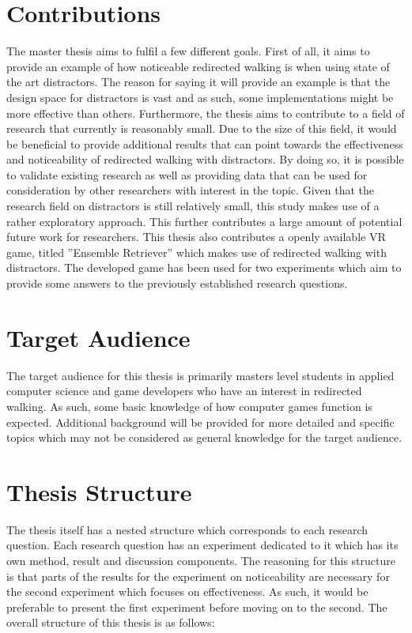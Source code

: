 \section{Contributions}
The master thesis aims to fulfil a few different goals. First of all, it aims to provide an example of how noticeable redirected walking is when using state of the art distractors. The reason for saying it will provide an example is that the design space for distractors is vast and as such, some implementations might be more effective than others. Furthermore, the thesis aims to contribute to a field of research that currently is reasonably small. Due to the size of this field, it would be beneficial to provide additional results that can point towards the effectiveness and noticeability of redirected walking with distractors. By doing so, it is possible to validate existing research as well as providing data that can be used for consideration by other researchers with interest in the topic. Given that the research field on distractors is still relatively small, this study makes use of a rather exploratory approach. This further contributes a large amount of potential future work for researchers. This thesis also contributes a openly available VR game, titled ''Ensemble Retriever'' which makes use of redirected walking with distractors. The developed game has been used for two experiments which aim to provide some answers to the previously established research questions.  

\section{Target Audience}
The target audience for this thesis is primarily masters level students in applied computer science and game developers who have an interest in redirected walking. As such, some basic knowledge of how computer games function is expected. Additional background will be provided for more detailed and specific topics which may not be considered as general knowledge for the target audience. 

\section{Thesis Structure}
The thesis itself has a nested structure which corresponds to each research question. Each research question has an experiment dedicated to it which has its own method, result and discussion components. The reasoning for this structure is that parts of the results for the experiment on noticeability are necessary for the second experiment which focuses on effectiveness. As such, it would be preferable to present the first experiment before moving on to the second. The overall structure of this thesis is as follows:

